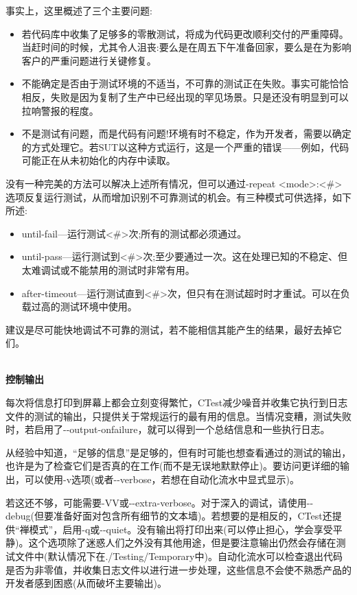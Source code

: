 事实上，这里概述了三个主要问题:

\begin{itemize}
\item 
若代码库中收集了足够多的零散测试，将成为代码更改顺利交付的严重障碍。当赶时间的时候，尤其令人沮丧:要么是在周五下午准备回家，要么是在为影响客户的严重问题进行关键修复。

\item 
不能确定是否由于测试环境的不适当，不可靠的测试正在失败。事实可能恰恰相反，失败是因为复制了生产中已经出现的罕见场景。只是还没有明显到可以拉响警报的程度。

\item 
不是测试有问题，而是代码有问题!环境有时不稳定，作为开发者，需要以确定的方式处理它。若SUT以这种方式运行，这是一个严重的错误——例如，代码可能正在从未初始化的内存中读取。
\end{itemize}

没有一种完美的方法可以解决上述所有情况，但可以通过-repeat <mode>:<\#>选项反复运行测试，从而增加识别不可靠测试的机会。有三种模式可供选择，如下所述:

\begin{itemize}
\item 
until-fail—运行测试<\#>次;所有的测试都必须通过。

\item 
until-pass—运行测试到<\#>次;至少要通过一次。这在处理已知的不稳定、但太难调试或不能禁用的测试时非常有用。

\item 
after-timeout—运行测试直到<\#>次，但只有在测试超时时才重试。可以在负载过高的测试环境中使用。
\end{itemize}

建议是尽可能快地调试不可靠的测试，若不能相信其能产生的结果，最好去掉它们。

\hspace*{\fill} \\ %
\noindent
\textbf{控制输出}

每次将信息打印到屏幕上都会立刻变得繁忙，CTest减少噪音并收集它执行到日志文件的测试的输出，只提供关于常规运行的最有用的信息。当情况变糟，测试失败时，若启用了-{}-output-onfailure，就可以得到一个总结信息和一些执行日志。

从经验中知道，“足够的信息”是足够的，但有时可能也想查看通过的测试的输出，也许是为了检查它们是否真的在工作(而不是无误地默默停止)。要访问更详细的输出，可以使用-v选项(或者-{}-verbose，若想在自动化流水中显式显示)。

若这还不够，可能需要-VV或-{}-extra-verbose。对于深入的调试，请使用-{}-debug(但要准备好面对包含所有细节的文本墙)。若想要的是相反的，CTest还提供“禅模式”，启用-q或-{}-quiet。没有输出将打印出来(可以停止担心，学会享受平静)。这个选项除了迷惑人们之外没有其他用途，但是要注意输出仍然会存储在测试文件中(默认情况下在./Testing/Temporary中)。自动化流水可以检查退出代码是否为非零值，并收集日志文件以进行进一步处理，这些信息不会使不熟悉产品的开发者感到困惑(从而破坏主要输出)。

